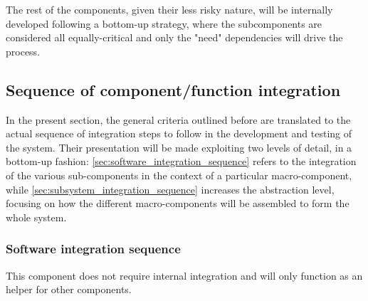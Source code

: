 	The rest of the components, given their less risky nature, will be internally developed following a bottom-up strategy, where the subcomponents are considered all equally-critical and only the "need" dependencies will drive the process.

\subsection{Sequence of component/function integration}
	In the present section, the general criteria outlined before are translated to the actual sequence of integration steps to follow in the development and testing of the system. Their presentation will be made exploiting two levels of detail, in a bottom-up fashion: \autoref{sec:software_integration_sequence} refers to the integration of the various sub-components in the context of a particular macro-component, while \autoref{sec:subsystem_integration_sequence} increases the abstraction level, focusing on how the different macro-components will be assembled to form the whole system.

	\subsubsection{Software integration sequence}
	\label{sec:software_integration_sequence}
			This component does not require internal integration and will only function as an helper for other components.

